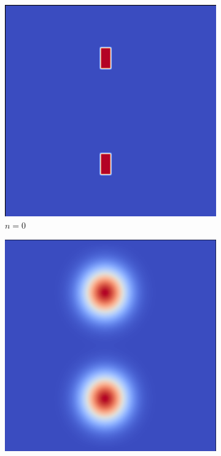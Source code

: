 \documentclass[12pt, letterpaper]{article}
\begin{document}
\begin{figure}[h]
  \caption{Heat Diffusion Progression}
  \label{fig:diffusionProgression}
  \centering
  \begin{subfigure}[b]{.21\linewidth}
    \includegraphics[width=\linewidth]{HeatProgression/diffusion0}
    \caption{$n=0$}
  \end{subfigure}
  \begin{subfigure}[b]{.21\linewidth}
    \includegraphics[width=\linewidth]{HeatProgression/diffusion1000}

\end{subfigure}
\end{figure}
\end{document}
